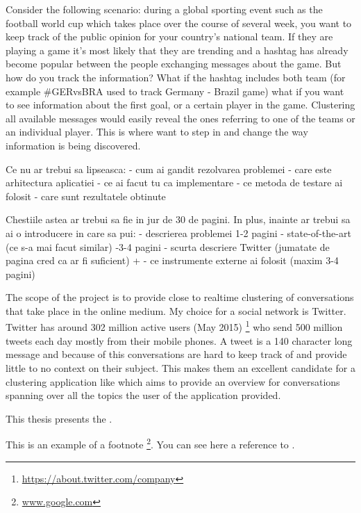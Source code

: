 \newline
Consider the following scenario: during a global sporting event such as the football world cup which takes place over the course of several week, you want to keep track of the public opinion for your country's national team. If they are playing a game it's most likely that they are trending and a hashtag has already become popular between the people exchanging messages about the game. But how do you track the information? What if the hashtag includes both team (for example \#GERvsBRA used to track Germany - Brazil game) what if you want to see information about the first goal, or a certain player in the game. Clustering all available messages would easily reveal the ones referring to one of the teams or an individual player. This is where {\project}  want to step in and change the way information is being discovered.

Ce nu ar trebui sa lipseasca: 
- cum ai gandit rezolvarea problemei
- care este arhitectura aplicatiei
- ce ai facut tu ca implementare
- ce metoda de testare ai folosit
- care sunt rezultatele obtinute

Chestiile astea ar trebui sa fie in jur de 30 de pagini. In plus, inainte ar trebui sa ai o introducere in care sa pui:
- descrierea problemei 1-2 pagini
- state-of-the-art (ce s-a mai facut similar) -3-4 pagini
- scurta descriere Twitter (jumatate de pagina cred ca ar fi suficient) + - ce instrumente externe ai folosit (maxim 3-4 pagini)

The scope of the project \textbf{\project} is to provide close to realtime 
clustering of conversations that take place in the online medium. My choice for
a social network is Twitter. Twitter has around 302 million active users (May 2015)
\footnote{\url{https://about.twitter.com/company}} who send 500 million tweets
each day mostly from their mobile phones. A tweet is a 140 character long message
and because of this conversations are hard to keep track of and provide little to
no context on their subject. This makes them an excellent candidate for a clustering application like \textbf{\project} which aims to provide an overview for  
conversations spanning over all the topics the user of the application provided.


This thesis presents the \textbf{\project}.

This is an example of a footnote \footnote{\url{www.google.com}}. You can see here a reference to .

